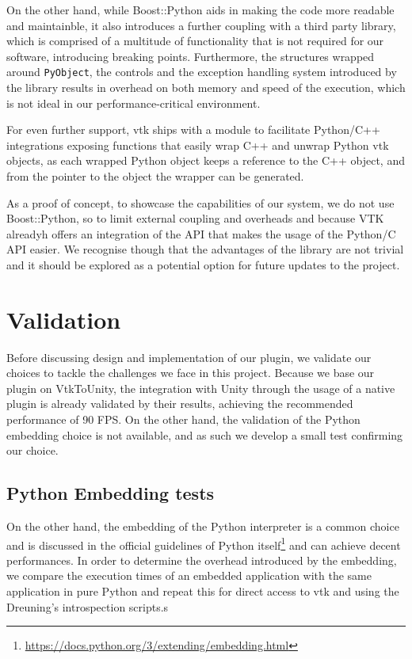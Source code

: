 On the other hand, while Boost::Python aids in making the code more readable and maintainble, it also introduces a further coupling with a third party library, which is comprised of a multitude of functionality that is not required for our software, introducing breaking points. Furthermore, the structures wrapped around \verb|PyObject|, the controls and the exception handling system introduced by the library results in overhead on both memory and speed of the execution, which is not ideal in our performance-critical environment. 

For even further support, \acrshort{vtk} ships with a module to facilitate Python/C++ integrations exposing functions that easily wrap C++ and unwrap Python \acrshort{vtk} objects, as each wrapped Python object keeps a reference to the C++ object, and from the pointer to the object the wrapper can be generated.

As a proof of concept, to showcase the capabilities of our system, we do not use Boost::Python, so to limit external coupling and overheads and because VTK alreadyh offers an integration of the API that makes the usage of the Python/C API easier. We recognise though that the advantages of the library are not trivial and it should be explored as a potential option for future updates to the project.

\section{Validation}
\label{sec:rqrmsandclngs-validation}

Before discussing design and implementation of our plugin, we validate our choices to tackle the challenges we face in this project. Because we base our plugin on VtkToUnity, the integration with Unity through the usage of a native plugin is already validated by their results, achieving the recommended performance of 90 FPS. On the other hand, the validation of the Python embedding choice is not available, and as such we develop a small test confirming our choice.

\subsection{Python Embedding tests}

On the other hand, the embedding of the Python interpreter is a common choice and is discussed in the official guidelines of Python itself\footnote{\url{https://docs.python.org/3/extending/embedding.html}} and can achieve decent performances. In order to determine the overhead introduced by the embedding, we compare the execution times of an embedded application with the same application in pure Python and repeat this for direct access to \acrshort{vtk} and using the Dreuning's introspection scripts.s


